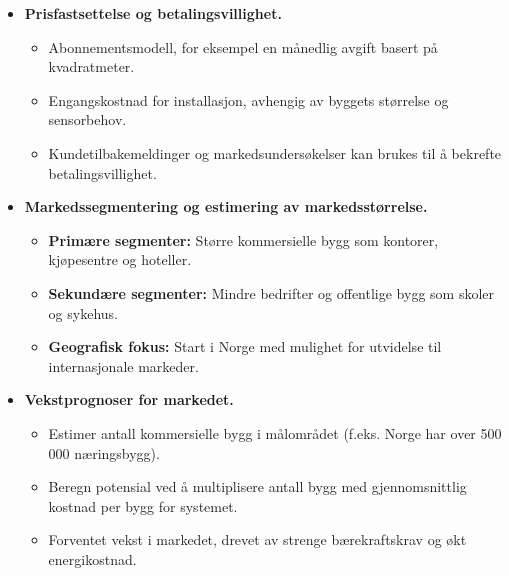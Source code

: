 \begin{itemize}
    \item \textbf{Prisfastsettelse og betalingsvillighet.} %
    \begin{itemize}
        \item Abonnementsmodell, for eksempel en månedlig avgift basert på kvadratmeter.
        \item Engangskostnad for installasjon, avhengig av byggets størrelse og sensorbehov.
        \item Kundetilbakemeldinger og markedsundersøkelser kan brukes til å bekrefte betalingsvillighet.
    \end{itemize}
    
    \item \textbf{Markedssegmentering og estimering av markedsstørrelse.} 
    \begin{itemize}
        \item \textbf{Primære segmenter:} Større kommersielle bygg som kontorer, kjøpesentre og hoteller.
        \item \textbf{Sekundære segmenter:} Mindre bedrifter og offentlige bygg som skoler og sykehus.
        \item \textbf{Geografisk fokus:} Start i Norge med mulighet for utvidelse til internasjonale markeder.
    \end{itemize} 

    \item \textbf{Vekstprognoser for markedet.} 
    \begin{itemize}    
        \item Estimer antall kommersielle bygg i målområdet (f.eks. Norge har over 500 000 næringsbygg).
        \item Beregn potensial ved å multiplisere antall bygg med gjennomsnittlig kostnad per bygg for systemet.
        \item Forventet vekst i markedet, drevet av strenge bærekraftskrav og økt energikostnad.
    \end{itemize}
\end{itemize}

